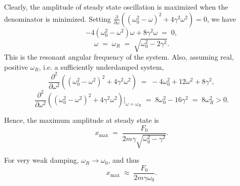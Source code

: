 \documentclass[10pt]{article}
\begin{document}
        Clearly, the amplitude of steady state oscillation is maximized when the denominator is minimized. Setting
        $\frac{\partial}{\partial \omega} ((\omega_0^2 - \omega)^2 + 4\gamma^2\omega^2)= 0$, we have
        \[
        -4(\omega_0^2 - \omega^2)\omega + 8\gamma^2\omega \;=\; 0,
        \]
        \[
        \omega \;=\; \omega_R \;=\; \sqrt{\omega_0^2 - 2\gamma^2}.
        \]
        This is the resonant angular frequency of the system. Also, assuming real, positive $\omega_R$, i.e. a sufficiently underdamped system,
        \[
        \frac{\partial^2}{\partial\omega^2} ((\omega_0^2 - \omega^2)^2 + 4\gamma^2\omega^2) \;=\; -4\omega_0^2 + 12\omega^2 + 8\gamma^2,
        \]
        \[
        \frac{\partial^2}{\partial\omega^2} ((\omega_0^2 - \omega^2)^2 + 4\gamma^2\omega^2)\Big|_{\omega = \omega_R} \;=\;
                8\omega_0^2 - 16\gamma^2 \;=\; 8\omega_R^2 > 0.
        \]

        Hence, the maximum amplitude at steady state is
        \[
        x_{\max} \;=\; \frac{F_0}{2m\gamma\sqrt{\omega_0^2 - \gamma^2}}.
        \]

        For very weak damping, $\omega_R \to \omega_0$, and thus
        \[
        x_{\max} \;\approx\; \frac{F_0}{2m\gamma\omega_0}.
        \]
\end{document}
